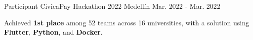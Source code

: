 
\begin{cventries}

  \cventry
  {Participant} %
  {CivicaPay Hackathon 2022} %
  {Medellín} %
  {Mar. 2022 - Mar. 2022} %
  {
    \begin{cvitems} %
      \item {Achieved \textbf{1st place} among 52 teams across 16 universities,
                  with a solution using \textbf{Flutter}, \textbf{Python},
                  and \textbf{Docker}.}
    \end{cvitems}
  }

\end{cventries}
